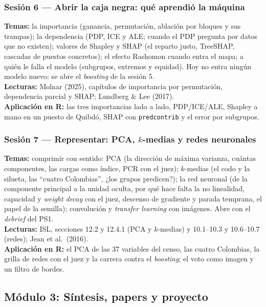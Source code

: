\documentclass[12pt,a4paper]{article}
\begin{document}
\subsubsection{Sesión 6 --- Abrir la caja negra: qué aprendió la máquina}
\textbf{Temas:} la importancia (ganancia, permutación, ablación por bloques y sus trampas); la dependencia (PDP, ICE y ALE; cuando el PDP pregunta por datos que no existen); valores de Shapley y SHAP (el reparto justo, TreeSHAP, cascadas de puestos concretos); el efecto Rashomon cuando entra el mapa; a quién le falla el modelo (subgrupos, extremos y equidad). Hoy no entra ningún modelo nuevo: se abre el \emph{boosting} de la sesión 5. \\
\textbf{Lecturas:} Molnar (2025), capítulos de importancia por permutación, dependencia parcial y SHAP; Lundberg \& Lee (2017). \\
\textbf{Aplicación en R:} las tres importancias lado a lado, PDP/ICE/ALE, Shapley a mano en un puesto de Quibdó, SHAP con \texttt{predcontrib} y el error por subgrupos.

\subsubsection{Sesión 7 --- Representar: PCA, $k$-medias y redes neuronales}
\textbf{Temas:} comprimir con sentido: PCA (la dirección de máxima varianza, cuántas componentes, las cargas como índice, PCR con el juez); $k$-medias (el codo y la silueta, las ``cuatro Colombias'', ¿los grupos predicen?); la red neuronal (de la componente principal a la unidad oculta, por qué hace falta la no linealidad, capacidad y \emph{weight decay} con el juez, descenso de gradiente y parada temprana, el papel de la semilla); convolución y \emph{transfer learning} con imágenes. Abre con el \emph{debrief} del PS1. \\
\textbf{Lecturas:} ISL, secciones 12.2 y 12.4.1 (PCA y $k$-medias) y 10.1--10.3 y 10.6--10.7 (redes); Jean et al.\ (2016). \\
\textbf{Aplicación en R:} el PCA de las 37 variables del censo, las cuatro Colombias, la grilla de redes con el juez y la carrera contra el \emph{boosting}; el voto como imagen y un filtro de bordes.

\subsection{Módulo 3: Síntesis, papers y proyecto}
\end{document}
